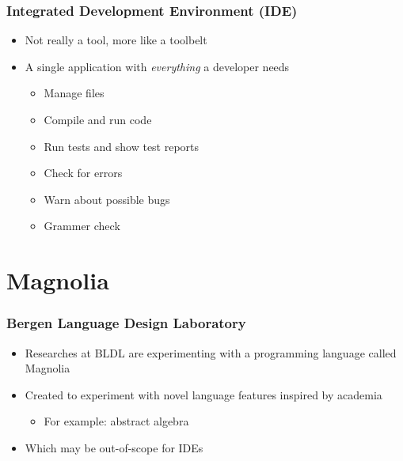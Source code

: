 \begin{frame}
  \frametitle{Integrated Development Environment (IDE)}
  \begin{itemize}
      \pause
    \item Not really a tool, more like a toolbelt
      \pause
    \item A single application with \textit{everything} a developer needs
      \pause
      \begin{itemize}
        \item Manage files
        \pause
        \item Compile and run code
        \pause
        \item Run tests and show test reports
        \pause
        \item Check for errors
        \pause
        \item Warn about possible bugs
        \pause
        \item Grammer check
      \end{itemize}
  \end{itemize}
\end{frame}

\section{Magnolia}
\SectionPage

\begin{frame}
  \frametitle{Bergen Language Design Laboratory}
  \begin{itemize}
    \item Researches at BLDL are experimenting with a programming language
    called Magnolia
      \pause
    \item Created to experiment with novel language features inspired by
    academia
      \pause
      \begin{itemize}
        \item For example: abstract algebra
      \end{itemize}
      \pause
    \item Which may be out-of-scope for IDEs
  \end{itemize}
\end{frame}

